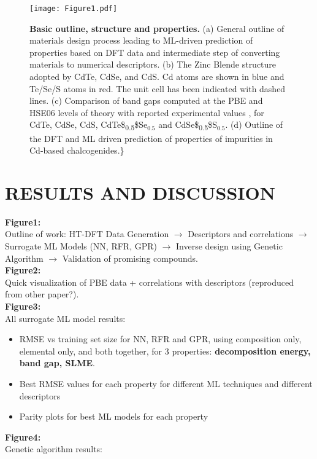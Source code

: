 \documentclass[11pt]{article}
\begin{document}
\begin{figure}[htbp]
\centering
\texttt{[image: Figure1.pdf]}
\caption{\label{fig:outline} \textbf{Basic outline, structure and properties.} (a) General outline of materials design process leading to ML-driven prediction of properties based on DFT data and intermediate step of converting materials to numerical descriptors. (b) The Zinc Blende structure adopted by CdTe, CdSe, and CdS. Cd atoms are shown in blue and Te/Se/S atoms in red. The unit cell has been indicated with dashed lines. (c) Comparison of band gaps computed at the PBE and HSE06 levels of theory with reported experimental values \cite{Expt_gap1,Expt_gap2}, for CdTe, CdSe, CdS, CdTe\$\textsubscript{0.5}\$Se\(_{0.5}\) and CdSe\$\textsubscript{0.5}\$S\(_{0.5}\). (d) Outline of the DFT and ML driven prediction of properties of impurities in Cd-based chalcogenides.\}}
\end{figure}

\section{RESULTS AND DISCUSSION}
\label{sec:orge645445}
\textbf{Figure1:}\\
Outline of work: HT-DFT Data Generation \(\rightarrow\) Descriptors and
correlations \(\rightarrow\) Surrogate ML Models (NN, RFR, GPR)
\(\rightarrow\) Inverse design using Genetic Algorithm \(\rightarrow\)
Validation of promising compounds.\\
\textbf{Figure2:}\\
Quick visualization of PBE data + correlations with descriptors
(reproduced from other paper?).\\
\textbf{Figure3:}\\
All surrogate ML model results:

\begin{itemize}
\item RMSE vs training set size for NN, RFR and GPR, using composition only,
elemental only, and both together, for 3 properties: \textbf{decomposition
energy, band gap, SLME}.

\item Best RMSE values for each property for different ML techniques and
different descriptors

\item Parity plots for best ML models for each property
\end{itemize}


\textbf{Figure4:}\\
Genetic algorithm results:
\end{document}
